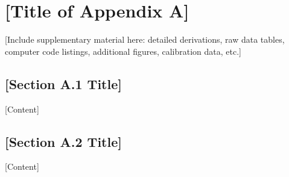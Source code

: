 \chapter{[Title of Appendix A]}

[Include supplementary material here: detailed derivations,
raw data tables, computer code listings, additional figures,
calibration data, etc.]

\section{[Section A.1 Title]}

[Content]

\section{[Section A.2 Title]}

[Content]
